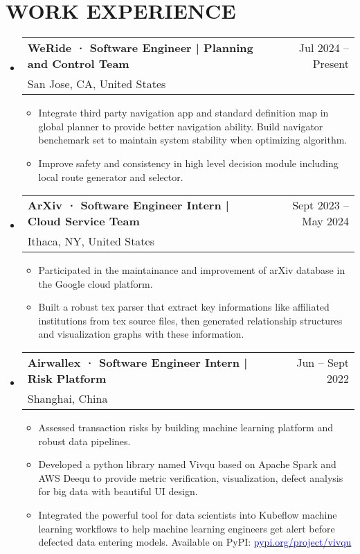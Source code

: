 \documentclass[letterpaper,11pt]{article}
\makeatletter
\newcommand{\resumeItem}[1]{
  \item{
    {#1 \vspace{-3pt}}
  }
}
\newcommand{\resumeSubheading}[4]{
  \vspace{-3pt}\item
    \renewcommand{\arraystretch}{1.0}
    \begin{tabular*}{0.97\textwidth}[t]{l@{\extracolsep{\fill}}r}
      \textbf{#1} & #2 \\
      \textnormal{#3} & \textnormal{#4} \\
    \end{tabular*}\vspace{-8pt}
}
\newcommand{\resumeSubHeadingListStart}{\begin{itemize}[leftmargin=0.15in, label={}]}
\newcommand{\resumeSubHeadingListEnd}{\end{itemize}}
\newcommand{\resumeItemListStart}{\begin{itemize}[leftmargin=11pt]}
\newcommand{\resumeItemListEnd}{\end{itemize}\vspace{-2pt}}
\makeatother
\begin{document}
\section{\textbf{WORK EXPERIENCE}}
\resumeSubHeadingListStart

    \resumeSubheading
      {WeRide · Software Engineer | Planning and Control Team}{Jul 2024 --  Present}
      {San Jose, CA, United States}{}
      \resumeItemListStart
        \small
        \resumeItem{Integrate third party navigation app and standard definition map in global planner to provide better navigation ability. Build navigator benchemark set to maintain system stability when optimizing algorithm. }
        \resumeItem{Improve safety and consistency in high level decision module including local route generator and selector.}
        \resumeItemListEnd

    \resumeSubheading
      {ArXiv · Software Engineer Intern | Cloud Service Team}{Sept 2023 --  May 2024}
      {Ithaca, NY, United States}{}
      \resumeItemListStart
        \small
        \resumeItem{Participated in the maintainance and improvement of arXiv database in the Google cloud platform.}
        \resumeItem{Built a robust tex parser that extract key informations like affiliated institutions from tex source files, then generated relationship structures and visualization graphs with these information. }

        \resumeItemListEnd

    \resumeSubheading
      {Airwallex · Software Engineer Intern | Risk Platform }{Jun -- Sept 2022}
      {Shanghai, China}{}
      \resumeItemListStart
        \small
        \resumeItem{Assessed transaction risks by building machine learning platform and robust data pipelines. }
        \resumeItem{Developed a python library named Vivqu based on Apache Spark and AWS Deequ to provide metric verification, visualization, defect analysis for big data with beautiful UI design.}
        \resumeItem{Integrated the  powerful tool for data scientists into Kubeflow machine learning workflows to help machine learning engineers get alert before defected data entering models. Available on PyPI: \href{https://pypi.org/project/vivqu/}{\textcolor{blue}{pypi.org/project/vivqu}}}
        \resumeItemListEnd

\resumeSubHeadingListEnd

\end{document}
